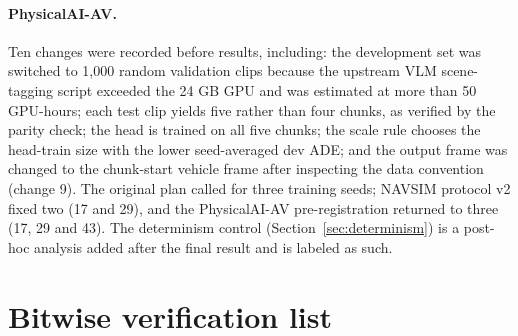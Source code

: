 \documentclass[10pt]{article}
\begin{document}
\paragraph{PhysicalAI-AV.} Ten changes were recorded before results, including: the development set was switched to 1,000 random validation clips because the upstream VLM scene-tagging script exceeded the 24 GB GPU and was estimated at more than 50 GPU-hours; each test clip yields five rather than four chunks, as verified by the parity check; the head is trained on all five chunks; the scale rule chooses the head-train size with the lower seed-averaged dev ADE; and the output frame was changed to the chunk-start vehicle frame after inspecting the data convention (change 9). The original plan called for three training seeds; NAVSIM protocol v2 fixed two (17 and 29), and the PhysicalAI-AV pre-registration returned to three (17, 29 and 43). The determinism control (Section~\ref{sec:determinism}) is a post-hoc analysis added after the final result and is labeled as such.

\section{Bitwise verification list}
\label{app:verification}
\end{document}
